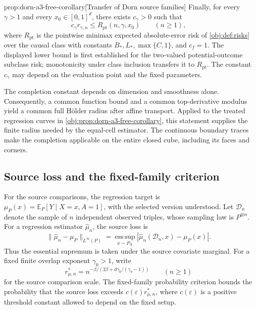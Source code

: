 \begin{propositionv}{prop:dorn-a3-free-corollary}[Transfer of Dorn source families]
Finally, for every \(\gamma>1\) and every \(x_0\in[0,1]^d\), there exists \(c_\gamma>0\) such that
\[
c_\gamma r_{\gamma,n}
\le R_{\mathrm{pt}}(n,\gamma,x_0)
\qquad(n\ge1),
\]
where \(R_{\mathrm{pt}}\) is the pointwise minimax expected absolute-error risk of \cref{obj:def:risks} over the causal class with constants \(B_*,L_*,\max\{C,1\}\), and \(c_f=1\). The displayed lower bound is first established for the two-valued potential-outcome subclass risk; monotonicity under class inclusion transfers it to \(R_{\mathrm{pt}}\). The constant \(c_\gamma\) may depend on the evaluation point and the fixed parameters.
\end{propositionv}

The completion constant depends on dimension and smoothness alone. Consequently, a common function bound and a common top-derivative modulus yield a common full Hölder radius after affine transport. Applied to the treated regression curves in \cref{obj:prop:dorn-a3-free-corollary}, this statement supplies the finite radius needed by the equal-cell estimator. The continuous boundary traces make the completion applicable on the entire closed cube, including its faces and corners.

\subsection{Source loss and the fixed-family criterion}

For the source comparisons, the regression target is \(\mu_P(x)=\mathbb E_P[Y\mid X=x,A=1]\), with the selected version understood. Let \(\mathcal D_n\) denote the sample of \(n\) independent observed triples, whose sampling law is \(P^{\otimes n}\). For a regression estimator \(\widehat\mu_n\), the source loss is
\[
\|\widehat\mu_n-\mu_P\|_{L^\infty(P)}
=
\operatorname*{ess\,sup}_{x\sim P_X}
|\widehat\mu_n(\mathcal D_n,x)-\mu_P(x)|.
\]
Thus the essential supremum is taken under the source covariate marginal. For a fixed finite overlap exponent \(\gamma_0>1\), write
\[
r^*_{\mu,n}
=
n^{-\beta/(2\beta+d\gamma_0/(\gamma_0-1))}
\qquad(n\ge1)
\]
for the source comparison scale. The fixed-family probability criterion bounds the probability that the source loss exceeds \(c(\varepsilon)r^*_{\mu,n}\), where \(c(\varepsilon)\) is a positive threshold constant allowed to depend on the fixed setup.

